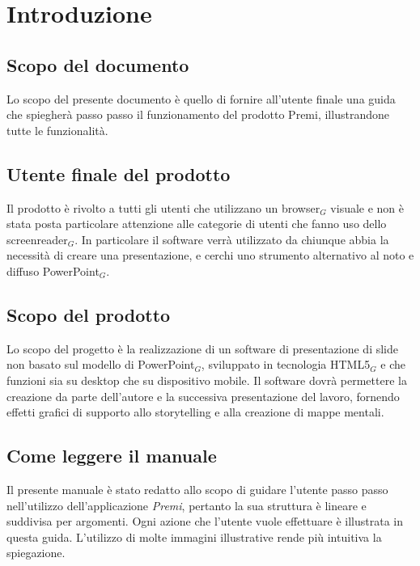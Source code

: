 \section{Introduzione}
\subsection{Scopo del documento}
Lo scopo del presente documento è quello di fornire all'utente finale una guida che spiegherà passo passo il funzionamento del prodotto Premi, illustrandone tutte le funzionalità.

\subsection{Utente finale del prodotto}
Il prodotto è rivolto a tutti gli utenti che utilizzano un browser$_G$ visuale e non è stata posta particolare attenzione alle categorie di utenti che fanno uso dello screenreader$_G$. In particolare il software verrà utilizzato da chiunque abbia la necessità di creare una presentazione, e cerchi uno strumento alternativo al noto e diffuso PowerPoint$_G$.

\subsection{Scopo del prodotto}
Lo scopo del progetto è la realizzazione di un software di presentazione di slide non basato sul modello di PowerPoint$_{G}$, sviluppato in tecnologia HTML5$_{G}$ e che funzioni sia su desktop che su dispositivo mobile. Il software dovrà permettere la creazione da parte dell'autore e la successiva presentazione del lavoro, fornendo effetti grafici di supporto allo storytelling e alla creazione di mappe mentali.

\subsection{Come leggere il manuale}
Il presente manuale è stato redatto allo scopo di guidare l'utente passo passo nell'utilizzo dell'applicazione \emph{Premi}, pertanto la sua struttura è lineare e suddivisa per argomenti. Ogni azione che l'utente vuole effettuare è illustrata in questa guida. L'utilizzo di molte immagini illustrative rende più intuitiva la spiegazione.

